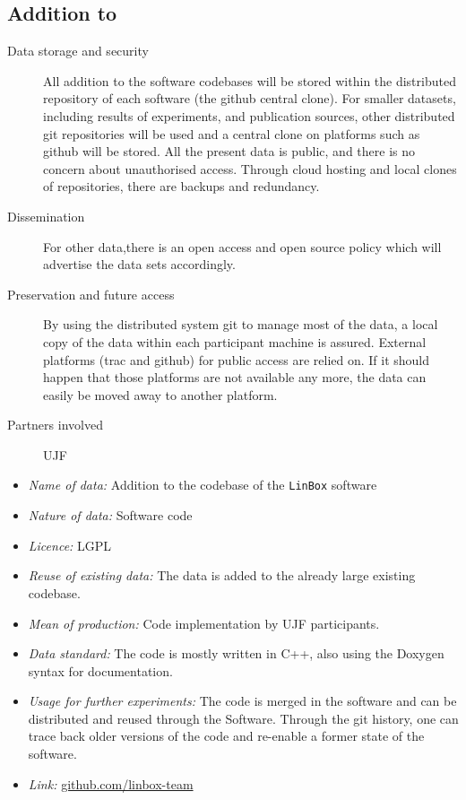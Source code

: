 \documentclass{../../Proposal/LaTeX-proposal/deliverablereport}
\begin{document}
\begin{enumerate}
\subsection{Addition to \Linbox}

\begin{description}
\item[Data storage and security] All addition to the software codebases will be stored within the distributed repository of each software (the github central clone). For smaller datasets, including results of experiments, and publication sources, other distributed git repositories will be used and a central clone on platforms such as github will be stored. All the present data is public, and there is no concern about unauthorised access. Through cloud hosting and local clones of repositories, there are backups and redundancy.
\item[Dissemination] For other data,there is an open access and open source policy which will advertise the data sets accordingly.
\item[Preservation and future access] By using the distributed system git to manage most of the data, a local copy of the data within each participant machine is assured. External platforms (trac and github) for public access are relied on. If it should happen that those platforms are not available any more, the data can easily be moved away to another platform.
\item[Partners involved] UJF
\end{description}

\begin{itemize}
\item\textit{Name of data:} Addition to the codebase of the \texttt{LinBox} software
\item\textit{Nature of data:} Software code
\item\textit{Licence:} LGPL
\item\textit{Reuse of existing data:} The data is added to the already large existing codebase.
\item\textit{Mean of production:} Code implementation by UJF participants.
\item\textit{Data standard:} The code is mostly written in C++, also using the Doxygen syntax for documentation.
\item\textit{Usage for further experiments:} The code is merged in the software and can be distributed and reused through the Software. Through the git history,
one can trace back older versions of the code and re-enable a former state of the software.
\item\textit{Link:} \href{https://github.com/linbox-team}{github.com/linbox-team}
\end{itemize}




\end{enumerate}
\end{document}
